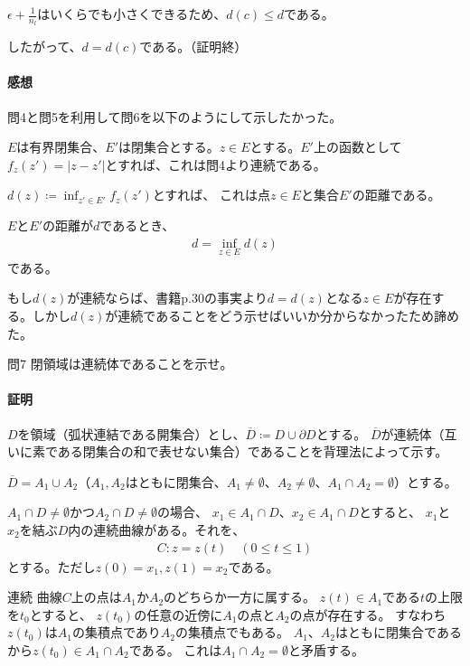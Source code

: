 $\epsilon+\frac{1}{n_l}$はいくらでも小さくできるため、$d(c)\le d$である。

したがって、$d=d(c)$である。（証明終）

\paragraph{感想}
問4と問5を利用して問6を以下のようにして示したかった。

$E$は有界閉集合、$E'$は閉集合とする。$z\in E$とする。$E'$上の函数として
$f_{z}(z')=|z-z'|$とすれば、これは問4より連続である。

$d(z)\coloneqq \inf_{z'\in E'}f_{z}(z')$とすれば、
これは点$z\in E$と集合$E'$の距離である。

$E$と$E'$の距離が$d$であるとき、
\begin{align*}
    d=\inf_{z\in E}d(z)
\end{align*}
である。

もし$d(z)$が連続ならば、書籍p.30の事実より$d=d(z)$となる$z\in E$が存在する。しかし$d(z)$が連続であることをどう示せばいいか分からなかったため諦めた。

\begin{mysimplebox}{問7}
    閉領域は連続体であることを示せ。
\end{mysimplebox}
\paragraph{証明}
$D$を領域（弧状連結である開集合）とし、$\overline{D}\coloneqq D\cup\partial D$とする。
$\overline{D}$が連続体（互いに素である閉集合の和で表せない集合）であることを背理法によって示す。

$\overline{D}=A_1\cup A_2$（$A_1, A_2$はともに閉集合、$A_1\neq\emptyset$、$A_2\neq\emptyset$、$A_1\cap A_2=\emptyset$）とする。

$A_1\cap D\neq\emptyset$かつ$A_2\cap D\neq\emptyset$の場合、
$x_1\in A_1\cap D$、$x_2\in A_1\cap D$とすると、
$x_1$と$x_2$を結ぶ$D$内の連続曲線がある。それを、
\begin{align*}
    C\colon z=z(t)\quad (0\le t \le 1)
\end{align*}
とする。ただし$z(0)=x_1, z(1)=x_2$である。

連続
曲線$C$上の点は$A_1$か$A_2$のどちらか一方に属する。
$z(t)\in A_1$である$t$の上限を$t_0$とすると、
$z(t_0)$の任意の近傍に$A_1$の点と$A_2$の点が存在する。
すなわち$z(t_0)$は$A_1$の集積点であり$A_2$の集積点でもある。
$A_1$、$A_2$はともに閉集合であるから$z(t_0)\in A_1\cap A_2$である。
これは$A_1\cap A_2=\emptyset$と矛盾する。

